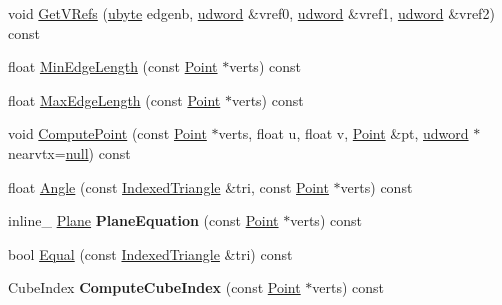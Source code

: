 \begin{DoxyCompactItemize}
\item 
void \hyperlink{class_indexed_triangle_a8aa9652bf4799555773d2ecdf3da3291}{Get\+V\+Refs} (\hyperlink{_ice_types_8h_a5dd4f281954ce1405c92d62a427f839a}{ubyte} edgenb, \hyperlink{_ice_types_8h_a44c6f1920ba5551225fb534f9d1a1733}{udword} \&vref0, \hyperlink{_ice_types_8h_a44c6f1920ba5551225fb534f9d1a1733}{udword} \&vref1, \hyperlink{_ice_types_8h_a44c6f1920ba5551225fb534f9d1a1733}{udword} \&vref2) const 
\item 
float \hyperlink{class_indexed_triangle_a6b2352d5b214898c58f5c5bca7a360ec}{Min\+Edge\+Length} (const \hyperlink{class_point}{Point} $\ast$verts) const 
\item 
float \hyperlink{class_indexed_triangle_abad2f26ec2a8cee0c2753d094e87fb9c}{Max\+Edge\+Length} (const \hyperlink{class_point}{Point} $\ast$verts) const 
\item 
void \hyperlink{class_indexed_triangle_a4acfb3e8e81f5b8d7b59365d8d0d1897}{Compute\+Point} (const \hyperlink{class_point}{Point} $\ast$verts, float u, float v, \hyperlink{class_point}{Point} \&pt, \hyperlink{_ice_types_8h_a44c6f1920ba5551225fb534f9d1a1733}{udword} $\ast$nearvtx=\hyperlink{_ice_types_8h_ac97b8ee753e4405397a42ad5799b0f9e}{null}) const 
\item 
float \hyperlink{class_indexed_triangle_a876ee32ea917ca66141fe867a29ecbb4}{Angle} (const \hyperlink{class_indexed_triangle}{Indexed\+Triangle} \&tri, const \hyperlink{class_point}{Point} $\ast$verts) const 
\item 
\hypertarget{class_indexed_triangle_a14e2d37a22733d895df30b14d82b7ee3}{inline\+\_\+ \hyperlink{class_plane}{Plane} {\bfseries Plane\+Equation} (const \hyperlink{class_point}{Point} $\ast$verts) const }\label{class_indexed_triangle_a14e2d37a22733d895df30b14d82b7ee3}

\item 
bool \hyperlink{class_indexed_triangle_a15b576c437f90be4d6b9e015006deb75}{Equal} (const \hyperlink{class_indexed_triangle}{Indexed\+Triangle} \&tri) const 
\item 
\hypertarget{class_indexed_triangle_ade9564ac288dfbe03572d859823aa5c8}{Cube\+Index {\bfseries Compute\+Cube\+Index} (const \hyperlink{class_point}{Point} $\ast$verts) const }\label{class_indexed_triangle_ade9564ac288dfbe03572d859823aa5c8}

\end{DoxyCompactItemize}
